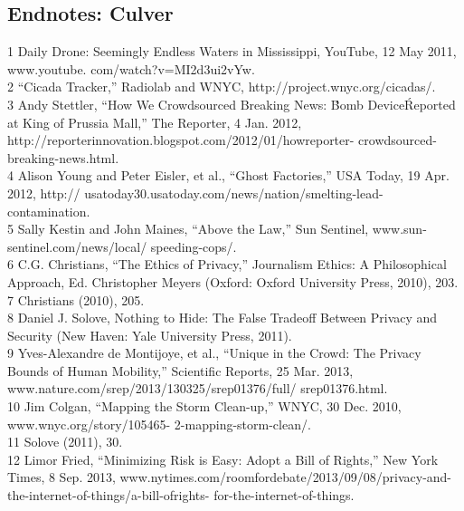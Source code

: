 \begin{itemize}
\section{Endnotes: Culver}
1 Daily Drone: Seemingly Endless Waters in Mississippi, YouTube, 12 May 2011, www.youtube.
com/watch?v=MI2d3ui2vYw.\\
2 ``Cicada Tracker,'' Radiolab and WNYC, http://project.wnyc.org/cicadas/.\\
3 Andy Stettler, ``How We Crowdsourced Breaking News: \'Bomb Device\' Reported at King of
Prussia Mall,'' The Reporter, 4 Jan. 2012, http://reporterinnovation.blogspot.com/2012/01/howreporter-
crowdsourced-breaking-news.html.\\
4 Alison Young and Peter Eisler, et al., ``Ghost Factories,'' USA Today, 19 Apr. 2012, http://
usatoday30.usatoday.com/news/nation/smelting-lead-contamination.\\
5 Sally Kestin and John Maines, ``Above the Law,'' Sun Sentinel, www.sun-sentinel.com/news/local/
speeding-cops/.\\
6 C.G. Christians, ``The Ethics of Privacy,'' Journalism Ethics: A Philosophical Approach, Ed.
Christopher Meyers (Oxford: Oxford University Press, 2010), 203.\\
7 Christians (2010), 205.\\
8 Daniel J. Solove, Nothing to Hide: The False Tradeoff Between Privacy and Security (New Haven:
Yale University Press, 2011).\\
9 Yves-Alexandre de Montijoye, et al., ``Unique in the Crowd: The Privacy Bounds of Human
Mobility,'' Scientific Reports, 25 Mar. 2013, www.nature.com/srep/2013/130325/srep01376/full/
srep01376.html.\\
10 Jim Colgan, ``Mapping the Storm Clean-up,'' WNYC, 30 Dec. 2010, www.wnyc.org/story/105465-
2-mapping-storm-clean/.\\
11 Solove (2011), 30.\\
12 Limor Fried, ``Minimizing Risk is Easy: Adopt a Bill of Rights,'' New York Times, 8 Sep. 2013,
www.nytimes.com/roomfordebate/2013/09/08/privacy-and-the-internet-of-things/a-bill-ofrights-
for-the-internet-of-things.\\



\end{itemize}
